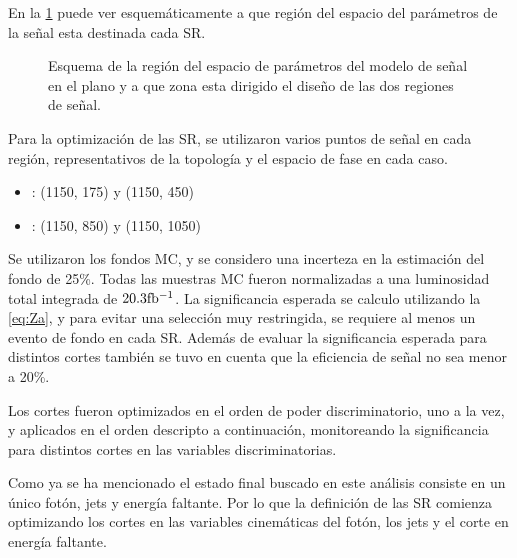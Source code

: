 En la \cref{fig:srs_motivation} puede ver esquemáticamente a que región del espacio
del parámetros de la señal \mgmn esta destinada cada SR.

\begin{figure}[!htbp]
  \centering
    \resizebox{0.5\textwidth}{!}{
      
      }
    \caption{Esquema de la región del espacio de parámetros del modelo de señal en el
    plano {\mgmn} y a que zona esta dirigido el diseño de las dos regiones de señal.}
  \label{fig:srs_motivation}
\end{figure}


Para la optimización de las SR, se utilizaron varios puntos de señal en cada región,
representativos de la topología y el espacio de fase en cada caso.

\begin{itemize}\itemsep0.2cm\parskip0.2cm
\item {\SRL}: (1150, 175) y (1150, 450)
\item {\SRH}: (1150, 850) y (1150, 1050)
\end{itemize}


Se utilizaron los fondos MC, y se considero una incerteza en la estimación del
fondo de 25\%. Todas las muestras MC fueron normalizadas a una luminosidad total
integrada de $20.3 \mbox{fb$^{-1}$}$. La significancia esperada se calculo utilizando la
\cref{eq:Za}, y para evitar una selección muy restringida, se requiere al menos
un evento de fondo en cada SR. Además de evaluar la significancia esperada para
distintos cortes también se tuvo en cuenta que la eficiencia de señal no sea
menor a 20\%.

Los cortes fueron optimizados en el orden de poder discriminatorio, uno a la
vez, y aplicados en el orden descripto a continuación, monitoreando la
significancia para distintos cortes en las variables discriminatorias.

Como ya se ha mencionado el estado final buscado en este análisis consiste en un
único fotón, jets y energía faltante. Por lo que la definición de las SR
comienza optimizando los cortes en las variables cinemáticas del fotón, los jets
y el corte en energía faltante.




